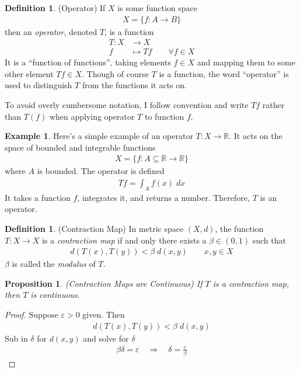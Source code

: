\documentclass[12pt]{article}
\theoremstyle{plain}
\newtheorem{prop}[thm]{Proposition}
\theoremstyle{definition}
\newtheorem{defn}[thm]{Definition}
\newtheorem{ex}[thm]{Example}
\theoremstyle{remark}
\newcommand{\R}{\mathbb{R}}
\begin{document}
\begin{defn}{(Operator)}
If $X$ is some function space
\begin{align*}
  X = \{f:A\rightarrow B\}
\end{align*}
then an \emph{operator}, denoted $T$, is a function
\begin{align*}
  T:X&\rightarrow X \\
  f&\mapsto Tf
  \qquad \forall f\in X
\end{align*}
It is a ``function of functions'', taking elements $f\in X$ and mapping
them to some other element $Tf\in X$. Though of course $T$ is a
function, the word ``operator'' is used to distinguish $T$ from the
functions it acts on.

To avoid overly cumbersome notation, I follow convention and write $Tf$
rather than $T(f)$ when applying operator $T$ to function $f$.
\end{defn}

\begin{ex}
Here's a simple example of an operator $T:X\rightarrow \R$. It acts on
the space of bounded and integrable functions
\begin{align*}
  X = \{f: A\subseteq \R \rightarrow \R\}
\end{align*}
where $A$ is bounded.
The operator is defined
\begin{align*}
  Tf = \int_A f(x) \; dx
\end{align*}
It takes a function $f$, integrates it, and returns a number.
Therefore, $T$ is an operator.
\end{ex}

\begin{defn}{(Contraction Map)}
In metric space $(X,d)$, the function $T: X\rightarrow X$ is a
\emph{contraction map} if and only there exists a $\beta \in (0,1)$ such
that
\begin{align*}
  d(T(x), T(y)) < \beta \; d(x,y)
  \qquad x,y\in X
\end{align*}
$\beta$ is called the \emph{modulus} of $T$.
\end{defn}

\begin{prop}{\emph{(Contraction Maps are Continuous)}}
If $T$ is a contraction map, then $T$ is continuous.
\end{prop}
\begin{proof}
Suppose $\varepsilon>0$ given. Then
\begin{align*}
  d(T(x),T(y)) < \beta \; d(x,y)
\end{align*}
Sub in $\delta$ for $d(x,y)$ and solve for $\delta$
\begin{align*}
  \beta \delta = \varepsilon
  \quad\Rightarrow\quad
  \delta = \frac{\varepsilon}{\beta}
\end{align*}
\end{proof}
\end{document}
